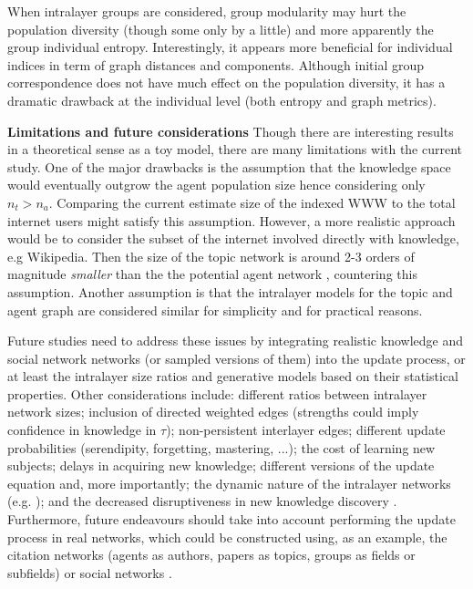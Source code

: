 \documentclass{svproc}
\begin{document}
When intralayer groups are considered, group modularity may hurt the population diversity (though some only by a little) and more apparently the group individual entropy.
Interestingly, it appears more beneficial for individual indices in term of graph distances and components.
Although initial group correspondence does not have much effect on the population diversity, it has a dramatic drawback at the individual level (both entropy and graph metrics).




\textbf{Limitations and future considerations}
Though there are interesting results in a theoretical sense as a toy model, there are many limitations with the current study.
    One of the major drawbacks is the assumption that the knowledge space would eventually outgrow the agent population size hence considering only $n_t > n_a$.
    Comparing the current estimate size of the indexed WWW \footnotemark[1] to the total internet users \footnotemark[2] might satisfy this assumption.
    However, a more realistic approach would be to consider the subset of the internet involved directly with knowledge, e.g Wikipedia. Then the size of the topic network \footnotemark[3] is around 2-3 orders of magnitude \textit{smaller} than the the potential agent network \footnotemark[2], countering this assumption.
Another assumption is that the intralayer models for the topic and agent graph are considered similar for simplicity and for practical reasons.

Future studies need to address these issues
    by integrating realistic knowledge and social network networks (or sampled versions of them) into the update process,
    or at least the intralayer size ratios and generative models based on their statistical properties.
Other considerations include:
    different ratios between intralayer network sizes;
    inclusion of directed weighted edges (strengths could imply confidence in knowledge in $\tau$);
    non-persistent interlayer edges;
    different update probabilities (serendipity, forgetting, mastering, ...);
    the cost of learning new subjects;
    delays in acquiring new knowledge;
    different versions of the update equation and, more importantly;
    the dynamic nature of the intralayer networks (e.g. \cite{Sun2020-qj});
    and the decreased disruptiveness in new knowledge discovery \cite{Park2021-jb}.
Furthermore, future endeavours should take into account performing the update process in real networks,
    which could be constructed using, as an example, the citation networks (agents as authors, papers as topics, groups as fields or subfields) or social networks \cite{Weng2015-zt}.
\end{document}
